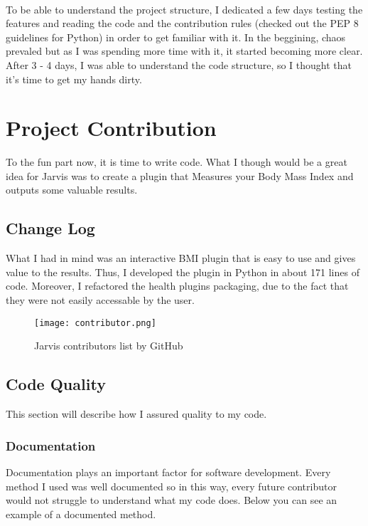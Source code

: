 \documentclass[12pt]{article}
\begin{document}
\paragraph{}
  To be able to understand the project structure, I dedicated a few days testing the features and reading the code and the contribution rules (checked out the PEP 8 guidelines for Python) in order to get familiar with it. In the beggining, chaos prevaled but as I was spending more time with it, it started becoming more clear. After 3 - 4 days, I was able to understand the code structure, so I thought that it's time to get my hands dirty.

\section{Project Contribution}

  To the fun part now, it is time to write code. What I though would be a great idea for Jarvis was to create a plugin that Measures your Body Mass Index and outputs some valuable results.    
  
  \subsection{Change Log}
  
  What I had in mind was an interactive BMI plugin that is easy to use and gives value to the results. Thus, I developed the plugin in Python in about 171 lines of code. Moreover, I refactored the health plugins packaging, due to the fact that they were not easily accessable by the user.
  
\begin{figure}[tph!]
\centerline{\texttt{[image: contributor.png]}}
    \caption{Jarvis contributors list by GitHub}
    \label{fig:verticalcell}
\end{figure}

  \subsection{Code Quality}
  
  This section will describe how I assured quality to my code.
  
  \subsubsection{Documentation}
  
  Documentation plays an important factor for software development. Every method I used was well documented so in this way, every future contributor would not struggle to understand what my code does. Below you can see an example of a documented method.
  
\end{document}
